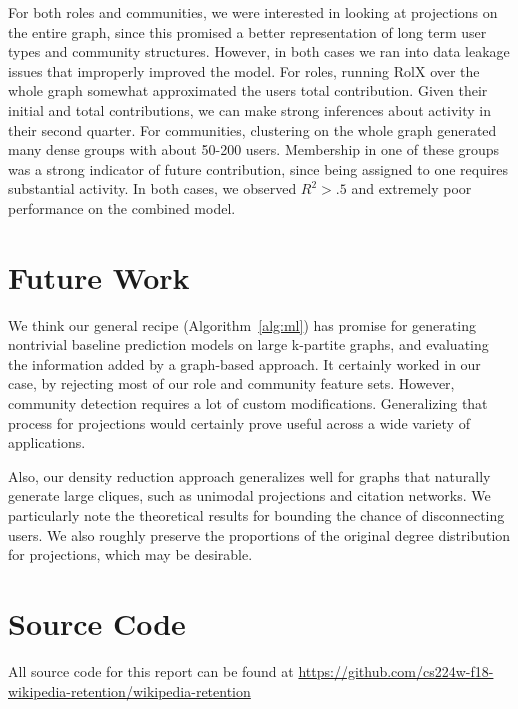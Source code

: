 \documentclass[letterpaper, 12pt, conference]{ieeeconf}
\begin{document}
For both roles and communities, we were interested in looking at projections on the entire graph, since this promised a better representation of long term user types and community structures. However, in both cases we ran into data leakage issues that improperly improved the model. For roles, running RolX over the whole graph somewhat approximated the users total contribution. Given their initial and total contributions, we can make strong inferences about activity in their second quarter. For communities, clustering on the whole graph generated many dense groups with about 50-200 users. Membership in one of these groups was a strong indicator of future contribution, since being assigned to one requires substantial activity. In both cases, we observed $R^2 > .5$ and extremely poor performance on the combined model.

\section{Future Work}


We think our general recipe (Algorithm~\ref{alg:ml}) has promise for generating nontrivial baseline prediction models on large k-partite graphs, and evaluating the information added by a graph-based approach. It certainly worked in our case, by rejecting most of our role and community feature sets. However, community detection requires a lot of custom modifications. Generalizing that process for projections would certainly prove useful across a wide variety of applications.

Also, our density reduction approach generalizes well for graphs that naturally generate large cliques, such as unimodal projections and citation networks. We particularly note the theoretical results for bounding the chance of disconnecting users. We also roughly preserve the proportions of the original degree distribution for projections, which may be desirable.

\section{Source Code}
All source code for this report can be found at \url{https://github.com/cs224w-f18-wikipedia-retention/wikipedia-retention}

\printbibliography[title={References}]
\end{document}
